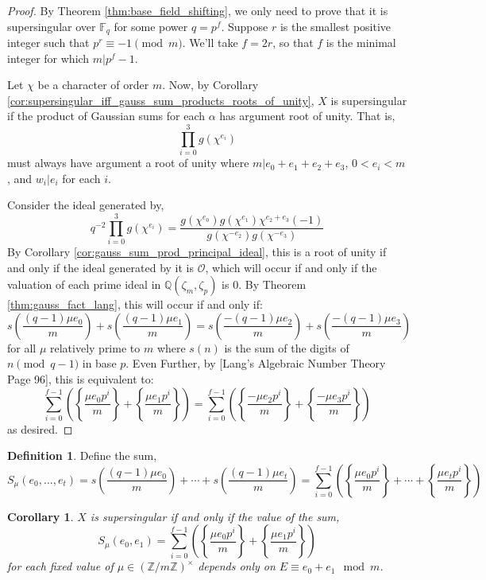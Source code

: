 \documentclass{article}
\newcommand{\Z}{\mathbb{Z}}
\newcommand{\Q}{\mathbb{Q}}
\newcommand{\F}{\mathbb{F}}
\newcommand{\iO}{\mathcal{O}}
\newtheorem{corollary}{Corollary}[theorem]
\theoremstyle{definition}
\theoremstyle{definition}
\newtheorem{definition}[theorem]{Definition}
\theoremstyle{remark}
\begin{document}
\begin{proof}
By Theorem \ref{thm:base_field_shifting}, we only need to prove that it is supersingular over $\F_q$ for some power $q = p^f$. Suppose $r$ is the smallest positive integer such that $p^r \equiv -1 \pmod{m}$. We'll take $f = 2r$, so that $f$ is the minimal integer for which $m | p^f - 1$. \par
Let $\chi$ be a character of order $m$. Now, by Corollary \ref{cor:supersingular_iff_gauss_sum_products_roots_of_unity}, $X$ is supersingular if the product of Gaussian sums for each $\alpha$ has argument root of unity. That is,
\[ \prod_{i = 0}^{3}g(\chi^{e_i}) \]
must always have argument a root of unity where $m | e_0 + e_1 + e_2 + e_3$, $0 < e_i < m$, and $w_i | e_i$ for each $i$.
\par
Consider the ideal generated by,
\[q^{-2}\prod_{i = 0}^{3}g(\chi^{e_i}) = \frac{g(\chi^{e_0})g(\chi^{e_1})\chi^{e_2 + e_3}(-1)}{g(\chi^{-e_2})g(\chi^{-e_3})}\]
By Corollary \ref{cor:gauss_sum_prod_principal_ideal}, this is a root of unity if and only if the ideal generated by it is $\iO$, which will occur if and only if the valuation of each prime ideal in $\Q(\zeta_m, \zeta_p)$ is 0. By Theorem \ref{thm:gauss_fact_lang}, this will occur if and only if:
\[s\left(\frac{(q-1)\mu e_0}{m}\right) + s\left(\frac{(q-1)\mu e_1}{m}\right) = s\left(\frac{-(q-1)\mu e_2}{m}\right) + s\left(\frac{-(q-1)\mu e_3}{m}\right)\] 
for all $\mu$ relatively prime to $m$ where $s(n)$ is the sum of the digits of $n \pmod{q-1}$ in base $p$. Even Further, by [Lang's Algebraic Number Theory Page 96], this is equivalent to:
\begin{equation*}
\sum_{i = 0}^{f-1} \left( \left\{\frac{\mu e_0p^i}{m}\right\} + \left\{\frac{\mu e_1p^i}{m}\right\} \right) 
= \sum_{i = 0}^{f-1} \left( \left\{\frac{-\mu e_2p^i}{m}\right\} + \left\{\frac{-\mu e_3p^i}{m}\right\} \right)
\end{equation*}
as desired.
\end{proof}

\begin{definition}
Define the sum,
\[ S_\mu(e_0, \dots, e_t) = s\left( \frac{(q-1) \mu e_0}{m} \right) + \cdots + s\left( \frac{(q-1) \mu e_t}{m} \right)  = \sum_{i = 0}^{f-1} \left( \left\{\frac{\mu e_0p^i}{m}\right\} + \cdots + \left\{\frac{\mu e_t p^i}{m}\right\} \right)  \]
\end{definition}

\begin{corollary} \label{cor:supersingular_iff_constant_sum}
$X$ is supersingular if and only if the value of the sum,
\[ S_\mu(e_0, e_1) = \sum_{i = 0}^{f-1} \left( \left\{\frac{\mu e_0p^i}{m}\right\} + \left\{\frac{\mu e_1p^i}{m}\right\} \right)  \]
for each fixed value of $\mu \in (\Z / m \Z)^\times$ depends only on $E \equiv e_0 + e_1 \mod{m}$. 
\end{corollary}
\end{document}
